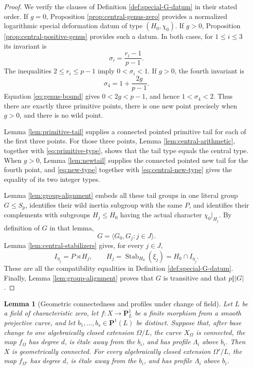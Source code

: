 \documentclass[11pt]{amsart}
\theoremstyle{plain}
\newtheorem{lemma}[theorem]{Lemma}
\theoremstyle{definition}
\numberwithin{equation}{section}
\begin{document}
\begin{proof}
We verify the clauses of Definition \ref{def:special-G-datum} in their
stated order.  If $g=0$, Proposition \ref{prop:central-genus-zero} provides
a normalized logarithmic special deformation datum of type
$(H_0,\chi_0)$.  If $g>0$, Proposition
\ref{prop:central-positive-genus} provides such a datum.  In both cases,
for $1\leq i\leq3$ its invariant is
\[
 \sigma_i=\frac{r_i-1}{p-1}.
\]
The inequalities $2\leq r_i\leq p-1$ imply
$0<\sigma_i<1$.  If $g>0$, the fourth invariant is
\[
 \sigma_4=1+\frac{2g}{p-1}.
\]
Equation \eqref{eq:genus-bound} gives $0<2g<p-1$, and hence
$1<\sigma_4<2$.  Thus there are exactly three primitive points, there is
one new point precisely when $g>0$, and there is no wild point.

Lemma \ref{lem:primitive-tail} supplies a connected pointed primitive tail
for each of the first three points.  For those three points, Lemma
\ref{lem:central-arithmetic}, together with \eqref{eq:primitive-type},
shows that the tail type equals the central type.  When $g>0$, Lemma
\ref{lem:newtail} supplies the connected pointed new tail for the fourth
point, and \eqref{eq:new-type} together with
\eqref{eq:central-new-type} gives the equality of its two integer types.

Lemma \ref{lem:group-alignment} embeds all these tail groups in one literal
group $G\leq S_p$, identifies their wild inertia subgroup with the same
$P$, and identifies their complements with subgroups $H_j\leq H_0$ having
the actual character $\chi_0|_{H_j}$.  By definition of $G$ in that lemma,
\[
 G=\langle G_0,G_j:j\in J\rangle.
\]
Lemma \ref{lem:central-stabilizers} gives, for every $j\in J$,
\[
 I_{\eta_j}=P\rtimes H_j,
 \qquad
 H_j=\operatorname{Stab}_{H_0}(\xi_j)=H_0\cap I_{\eta_j}.
\]
These are all the compatibility equalities in Definition
\ref{def:special-G-datum}.  Finally, Lemma \ref{lem:group-alignment} proves
that $G$ is transitive and that $p\Vert |G|$.
\end{proof}

\begin{lemma}[Geometric connectedness and profiles under change of field]
\label{lem:char-zero-base-change}
Let $L$ be a field of characteristic zero, let
$f:X\to\mathbf P^1_L$ be a finite morphism from a smooth projective curve,
and let $b_1,\ldots,b_s\in\mathbf P^1(L)$ be distinct.  Suppose that, after
base change to one algebraically closed extension $\Omega/L$, the curve
$X_\Omega$ is connected, the map $f_\Omega$ has degree $d$, is \'etale away
from the $b_i$, and has profile $\Lambda_i$ above $b_i$.  Then $X$ is
geometrically connected.  For every algebraically closed extension
$\Omega'/L$, the map $f_{\Omega'}$ has degree $d$, is \'etale away from the
$b_i$, and has profile $\Lambda_i$ above $b_i$.
\end{lemma}
\end{document}
